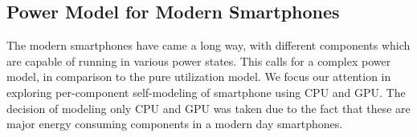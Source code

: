 \subsection{Power Model for Modern Smartphones}

The modern smartphones have came a long way, with different components which are capable of running in various power states.
This calls for a complex power model, in comparison to the pure utilization model.
We focus our attention in exploring per-component self-modeling of smartphone using CPU and GPU.
The decision of modeling only CPU and GPU was taken due to the fact that these are major energy consuming components in a modern day smartphones.

\fi


%
%


